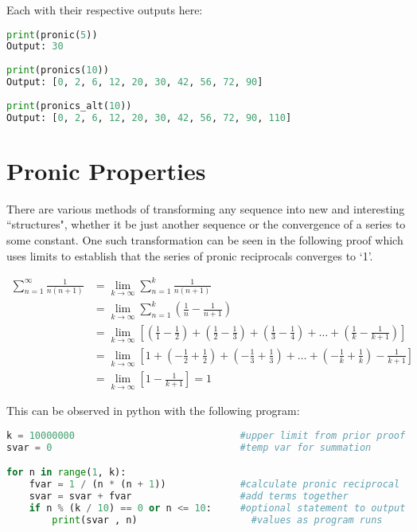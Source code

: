\documentclass[12]{article}
\begin{document}
Each with their respective outputs here:

\begin{lstlisting}[style=mycodestyle, language=Python]
print(pronic(5))
Output: 30
	
print(pronics(10)) 
Output: [0, 2, 6, 12, 20, 30, 42, 56, 72, 90]
	
print(pronics_alt(10))
Output: [0, 2, 6, 12, 20, 30, 42, 56, 72, 90, 110]
\end{lstlisting}

\section{Pronic Properties}

There are various methods of transforming any sequence into new and interesting ``structures", whether it be just another sequence or the convergence of a series to some constant. One such transformation can be seen in the following proof which uses limits to establish that the series of pronic reciprocals converges to `1'.

\begin{align*}
	\sum_{n = 1}^{\infty}\frac{1}{n(n+1)} &= \lim_{k\to\infty}\sum_{n = 1}^{k}\frac{1}{n(n+1)} \\
	&= \lim_{k\to\infty}\sum_{n = 1}^{k}\left(\frac{1}{n} - \frac{1}{n+1}\right) \\
	&= \lim_{k\to\infty}\left[\left(\frac{1}{1} - \frac{1}{2}\right) + \left(\frac{1}{2} - \frac{1}{3}\right) + \left(\frac{1}{3} - \frac{1}{4}\right) + \dots + \left(\frac{1}{k} - \frac{1}{k+1}\right)\right] \\
	&= \lim_{k\to\infty}\left[1 + \left(-\frac{1}{2} + \frac{1}{2}\right) + \left(-\frac{1}{3} + \frac{1}{3}\right) + \dots + \left(-\frac{1}{k} + \frac{1}{k}\right) -\frac{1}{k+1}\right] \\
	&= \lim_{k\to\infty}\left[1 - \frac{1}{k+1}\right] = 1
\end{align*}

This can be observed in python with the following program:

\begin{lstlisting}[style=mycodestyle, language=Python]
k = 10000000                             #upper limit from prior proof
svar = 0                                 #temp var for summation

for n in range(1, k):
	fvar = 1 / (n * (n + 1))             #calculate pronic reciprocal
	svar = svar + fvar                   #add terms together
	if n % (k / 10) == 0 or n <= 10:     #optional statement to output
		print(svar , n)                    #values as program runs
\end{lstlisting}
\end{document}
